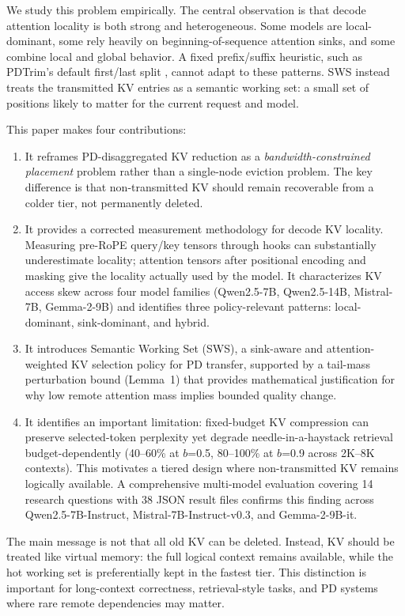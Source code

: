 \documentclass[11pt]{article}
\newcommand{\method}{SWS}
\newcommand{\fullmethod}{Semantic Working Set}
\newcommand{\pct}{\%}
\theoremstyle{definition}
\theoremstyle{plain}
\begin{document}
We study this problem empirically.  The central observation is that decode attention locality is both strong and heterogeneous.  Some models are local-dominant, some rely heavily on beginning-of-sequence attention sinks, and some combine local and global behavior.  A fixed prefix/suffix heuristic, such as PDTrim's default first/last split \citep{pdtrim}, cannot adapt to these patterns.  \method{} instead treats the transmitted KV entries as a semantic working set: a small set of positions likely to matter for the current request and model.

This paper makes four contributions:
\begin{enumerate}[leftmargin=1.5em,itemsep=2pt]
  \item It reframes PD-disaggregated KV reduction as a \emph{bandwidth-constrained placement} problem rather than a single-node eviction problem.  The key difference is that non-transmitted KV should remain recoverable from a colder tier, not permanently deleted.
  \item It provides a corrected measurement methodology for decode KV locality.  Measuring pre-RoPE query/key tensors through hooks can substantially underestimate locality; attention tensors after positional encoding and masking give the locality actually used by the model.  It characterizes KV access skew across four model families (Qwen2.5-7B, Qwen2.5-14B, Mistral-7B, Gemma-2-9B) and identifies three policy-relevant patterns: local-dominant, sink-dominant, and hybrid.
  \item It introduces \fullmethod{} (\method{}), a sink-aware and attention-weighted KV selection policy for PD transfer, supported by a tail-mass perturbation bound (Lemma~1) that provides mathematical justification for why low remote attention mass implies bounded quality change.
  \item It identifies an important limitation: fixed-budget KV compression can preserve selected-token perplexity yet degrade needle-in-a-haystack retrieval budget-dependently (40--60\pct{} at $b$=0.5, 80--100\pct{} at $b$=0.9 across 2K--8K contexts).  This motivates a tiered design where non-transmitted KV remains logically available.  A comprehensive multi-model evaluation covering 14 research questions with 38 JSON result files confirms this finding across Qwen2.5-7B-Instruct, Mistral-7B-Instruct-v0.3, and Gemma-2-9B-it.
\end{enumerate}

The main message is not that all old KV can be deleted.  Instead, KV should be treated like virtual memory: the full logical context remains available, while the hot working set is preferentially kept in the fastest tier.  This distinction is important for long-context correctness, retrieval-style tasks, and PD systems where rare remote dependencies may matter.
\end{document}
